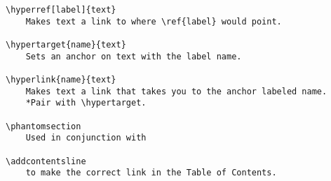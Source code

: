\documentclass[class=article, crop=false, titlepage, twoside, multi={itemize, figure, verbatim}, float=false]{standalone}
\begin{document}
\begin{verbatim}
\hyperref[label]{text} 
    Makes text a link to where \ref{label} would point.
  
\hypertarget{name}{text}
    Sets an anchor on text with the label name.
     
\hyperlink{name}{text} 
    Makes text a link that takes you to the anchor labeled name.     
    *Pair with \hypertarget.
 
\phantomsection
    Used in conjunction with

\addcontentsline 
    to make the correct link in the Table of Contents.
\end{verbatim}				
\end{document}
